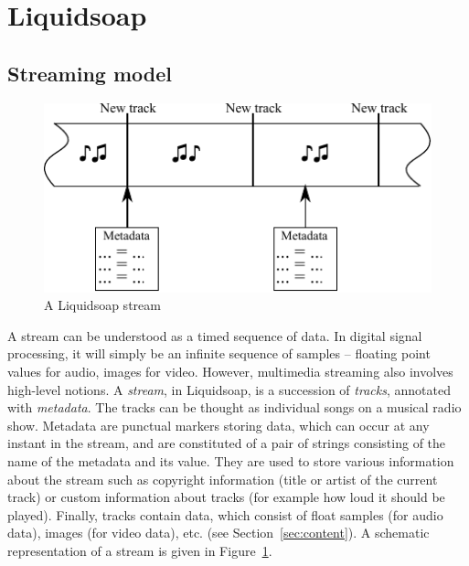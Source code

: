 \documentclass{llncs}
\newcommand{\liquidsoap}{Liquidsoap}
\newcommand{\TODO}[1]{\marginpar{\tiny #1}}
\newcommand{\fcaption}[1]{\vspace{-3ex}\caption{#1}\vspace{-4ex}}
\begin{document}

\section{Liquidsoap}
\label{sec:liq}
\subsection{Streaming model}
\label{sec:model}
\begin{figure}
  \vspace{-7.5ex}
  \begin{center}
    \includegraphics{stream}
  \end{center}
  \fcaption{A \liquidsoap{} stream}
  \label{fig:stream}
\end{figure}
A stream can be understood as a timed sequence of data.
In digital signal processing, it will simply be an infinite sequence of 
samples -- floating point values for audio, images for video.
However, multimedia streaming also involves high-level notions.
A \emph{stream}, in \liquidsoap{}, is a succession of \emph{tracks}, annotated
with \textit{metadata}. The tracks can be thought
as individual songs on a musical radio show. 
Metadata are punctual markers storing data, which can occur at any instant in the
stream, and are constituted of a pair of strings consisting of the name of
the metadata and its value. They are used to store various information about the
stream such as copyright information (title or artist of
the current track) or custom information about tracks (for example how loud it
should be played).
Finally, tracks contain data, which consist of float samples 
(for audio data), images (for video data), etc. (see Section~\ref{sec:content}).
A schematic representation of a stream is given in Figure~\ref{fig:stream}.
\end{document}
